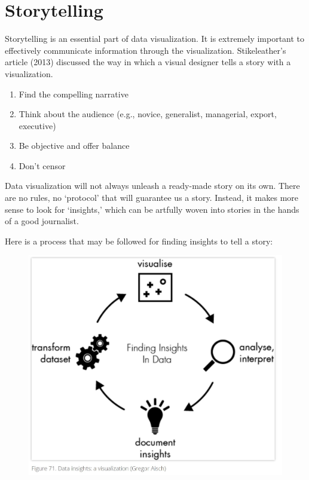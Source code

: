 \documentclass[]{book}
\providecommand{\tightlist}{%
  \setlength{\itemsep}{0pt}\setlength{\parskip}{0pt}}
\theoremstyle{definition}
\theoremstyle{definition}
\theoremstyle{definition}
\theoremstyle{remark}
\begin{document}
\section{Storytelling}\label{storytelling}

Storytelling is an essential part of data visualization. It is extremely
important to effectively communicate information through the
visualization. Stikeleather's article (2013) discussed the way in which
a visual designer tells a story with a visualization.

\begin{enumerate}
\def\labelenumi{\arabic{enumi}.}
\tightlist
\item
  Find the compelling narrative
\item
  Think about the audience (e.g., novice, generalist, managerial,
  export, executive)
\item
  Be objective and offer balance
\item
  Don't censor
\end{enumerate}

Data visualization will not always unleash a ready-made story on its
own. There are no rules, no `protocol' that will guarantee us a story.
Instead, it makes more sense to look for `insights,' which can be
artfully woven into stories in the hands of a good journalist.

Here is a process that may be followed for finding insights to tell a
story:

\citep{VisualizeToInsights}

\begin{figure}
\centering
\includegraphics{images/DataInsights.JPG}
\caption{}
\end{figure}
\end{document}
